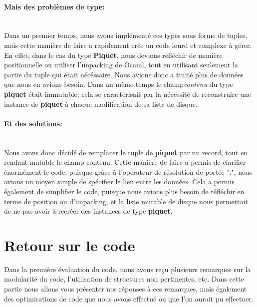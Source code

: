 \documentclass[a4paper,11pt]{article}
\begin{document}
\paragraph{Mais des problèmes de type:}\mbox{}\\
Dans un premier temps, nous avons implémenté ces types sous forme de tuples, mais cette manière de faire a rapidement crée un code lourd et complexe à gérer.
En effet, dans le cas du type \textbf{Piquet}, nous devions réfléchir de manière positionnelle ou utiliser l'unpacking de Ocaml, tout en utilisant seulement la partie du tuple qui était nécéssaire. Nous avions donc a traité plus de données que nous en avions besoin.
Dans un même temps le \og champ\fg \textit{contenu} du type \textbf{piquet} était immutable,
cela se caractérisait par la nécessité de reconstruire une instance de \textbf{piquet} à chaque modification de sa liste de disque.
\paragraph{Et des solutions:}\mbox{}\\
Nous avons donc décidé de remplacer le tuple de \textbf{piquet} par un record, tout en rendant mutable le champ contenu.
Cette manière de faire a permis de clarifier énormément le code, puisque grâce à l'opérateur de résolution 
de portée ".", nous avions un moyen simple de spécifier le lien entre les données.
Cela a permis également de simplifier le code, puisque nous avions plus besoin de réfléchir en terme de position ou d'unpacking, et la liste mutable de disque nous permettait de ne pas avoir à recréer des instances de type \textbf{piquet}.


\section{Retour sur le code}
Dans la première évaluation du code, nous avons reçu plusieurs remarques sur la modularité du code, l'utilisation de structures non pertinentes, etc.
Dans cette partie nous allons vous présenter nos réponses à ces remarques, mais également des optimisations de code que nous avons effectué ou que l'on aurait pu effectuer.
\end{document}
